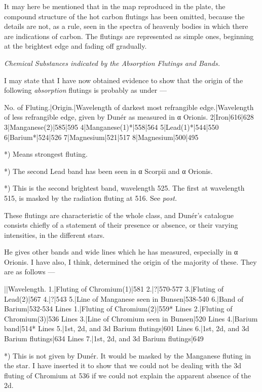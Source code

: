\documentclass[a4paper, 12pt, oneside, polutonikogreek, english]{article}
\begin{document}
It may here be mentioned that in the map reproduced in the plate, the compound structure of the hot carbon flutings has been omitted, because the details are not, as a rule, seen in the spectra of heavenly bodies in which there are indications of carbon. The flutings are represented as simple ones, beginning at the brightest edge and fading off gradually.

\emph{Chemical Substances indicated by the Absorption Flutings and Bands.}

I may state that I have now obtained evidence to show that the origin of the following \emph{absorption} flutings is probably as under ---

No. of Fluting.|Origin.|Wavelength of darkest most refrangible edge.|Wavelength of less refrangible edge, given by Dunér as measured in α Orionis. 
2|Iron|616|628 
3|Manganese(2)|585|595 
4|Manganese(1)*|558|564 
5|Lead(1)*|544|550 
6|Barium*|524|526 
7|Magnesium|521|517 
8|Magnesium|500|495 

*) Means strongest fluting.

*) The second Lead band has been seen in α Scorpii and α Orionis.

*) This is the second brightest band, wavelength 525. The first at wavelength 515, is masked by the radiation fluting at 516. See \emph{post.}

These flutings are characteristic of the whole class, and Dunér's catalogue consists chiefly of a statement of their presence or absence, or their varying intensities, in the different stars.

He gives other bands and wide lines which he has measured, especially in α Orionis. I have also, I think, determined the origin of the majority of these. They are as follows ---

||Wavelength. 
1.|Fluting of Chromium(1)|581 
2.|?|570-577 
3.|Fluting of Lead(2)|567 
4.|?|543 
5.|Line of Manganese seen in Bunsen|538-540 
6.|Band of Barium|532-534 
Lines 1.|Fluting of Chromium(2)|559* 
Lines 2.|Fluting of Chromium(3)|536 
Lines 3.|Line of Chromium seen in Bunsen|520 
Lines 4.|Barium band|514* 
Lines 5.|1st, 2d, and 3d Barium flutings|601 
Lines 6.|1st, 2d, and 3d Barium flutings|634 
Lines 7.|1st, 2d, and 3d Barium flutings|649 

*) This is not given by Dunér. It would be masked by the Manganese fluting in the star. I have inserted it to show that we could not be dealing with the 3d fluting of Chromium at 536 if we could not explain the apparent absence of the 2d.
\end{document}
